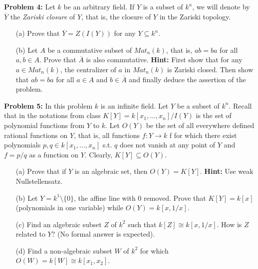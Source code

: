 \documentclass[12pt]{article}
\begin{document}
\skv
{\bf Problem 4:} Let $k$ be an arbitrary field. If $Y$ is a subset of $k^n$, we will
denote by $\overline Y$ the {\it Zariski closure} of $Y$, that is, the closure of $Y$ in the 
Zariski topology. 
\begin{itemize}
\item[(a)] Prove that $\overline Y=Z(I(Y))$ for any $Y\subseteq k^n$. 
\item[(b)] Let $A$ be a commutative subset of $Mat_n(k)$, that is, $ab=ba$ for all $a,b\in A$.
Prove that $\overline A$ is also commutative. {\bf Hint:} First show that for any $a\in Mat_n(k)$,
the centralizer of $a$ in $Mat_n(k)$ is Zariski closed. Then show that $ab=ba$ for all $a\in A$
and $b\in \overline A$ and finally deduce the assertion of the problem.
\end{itemize}
\skv
{\bf Problem 5:} In this problem $k$ is an infinite field.
Let $Y$ be a subset of $k^n$. Recall that in the notations from class 
$K[Y]=k[x_1,\ldots, x_n]/I(Y)$ is the set of polynomial functions from $Y$ to $k$. Let $O(Y)$
be the set of all everywhere defined rational functions on $Y$, that is,
all functions $f:Y\to k$ f for which there exist polynomials $p,q\in k[x_1,\ldots, x_n]$
s.t. $q$ does not vanish at any point of $Y$ and $f=p/q$ as a function on $Y$. Clearly,
$K[Y]\subseteq O(Y)$.
\begin{itemize}
\item[(a)] Prove that if $Y$ is an algebraic set, then $O(Y)=K[Y]$. {\bf Hint:} Use weak
Nullstellensatz.
\item[(b)] Let $Y=k^1\setminus\{0\}$, the affine line with $0$ removed. Prove that
$K[Y]=k[x]$ (polynomials in one variable) while $O(Y)=k[x,1/x]$.
\item[(c)] Find an algebraic subset $Z$ of $k^2$ such that $k[Z]\cong k[x,1/x]$.
How is $Z$ related to $Y$? (No formal answer is expected).
\item[(d)] Find a non-algebraic subset $W$ of $k^2$ for which $O(W)=k[W]\cong k[x_1,x_2]$.
\end{itemize}
\end{document}
